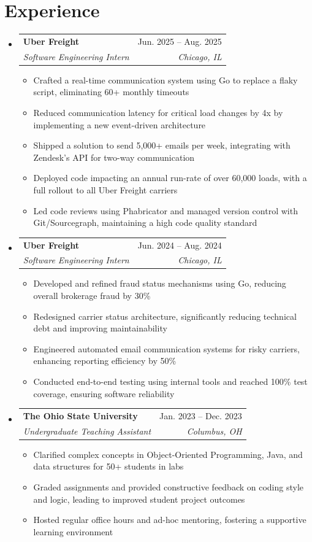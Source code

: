 \documentclass[letterpaper,11pt]{article}
\makeatletter
\newcommand{\resumeItem}[1]{
  \item\small{
    {#1 \vspace{-2pt}}
  }
}
\newcommand{\resumeSubheading}[4]{
  \vspace{-2pt}\item
    \begin{tabular*}{0.97\textwidth}[t]{l@{\extracolsep{\fill}}r}
      \textbf{#1} & #2 \\
      \textit{\small#3} & \textit{\small #4} \\
    \end{tabular*}\vspace{-7pt}
}
\newcommand{\resumeSubHeadingListStart}{\begin{itemize}[leftmargin=0.15in, label={}]}
\newcommand{\resumeSubHeadingListEnd}{\end{itemize}}
\newcommand{\resumeItemListStart}{\begin{itemize}}
\newcommand{\resumeItemListEnd}{\end{itemize}\vspace{-5pt}}
\makeatother
\begin{document}
\section{Experience}
  \resumeSubHeadingListStart
      \resumeSubheading
      {Uber Freight}{Jun. 2025 -- Aug. 2025}
      {Software Engineering Intern}{Chicago, IL}
      \resumeItemListStart
        \resumeItem{Crafted a real-time communication system using Go to replace a flaky script, eliminating 60+ monthly timeouts}
        \resumeItem{Reduced communication latency for critical load changes by 4x by implementing a new event-driven architecture}
        \resumeItem{Shipped a solution to send 5,000+ emails per week, integrating with Zendesk's API for two-way communication}
        \resumeItem{Deployed code impacting an annual run-rate of over 60,000 loads, with a full rollout to all Uber Freight carriers}
        \resumeItem{Led code reviews using Phabricator and managed version control with Git/Sourcegraph, maintaining a high code quality standard}
      \resumeItemListEnd
      \resumeSubheading
      {Uber Freight}{Jun. 2024 -- Aug. 2024}
      {Software Engineering Intern}{Chicago, IL}
      \resumeItemListStart
        \resumeItem{Developed and refined fraud status mechanisms using Go, reducing overall brokerage fraud by 30\%}
        \resumeItem{Redesigned carrier status architecture, significantly reducing technical debt and improving maintainability}
        \resumeItem{Engineered automated email communication systems for risky carriers, enhancing reporting efficiency by 50\%}
        \resumeItem{Conducted end-to-end testing using internal tools and reached 100\% test coverage, ensuring software reliability}
      \resumeItemListEnd
    \resumeSubheading
      {The Ohio State University}{Jan. 2023 -- Dec. 2023}
      {Undergraduate Teaching Assistant}{Columbus, OH}
      \resumeItemListStart
        \resumeItem{Clarified complex concepts in Object-Oriented Programming, Java, and data structures for 50+ students in labs}
        \resumeItem{Graded assignments and provided constructive feedback on coding style and logic, leading to improved student project outcomes}
        \resumeItem{Hosted regular office hours and ad-hoc mentoring, fostering a supportive learning environment}
      \resumeItemListEnd
  \resumeSubHeadingListEnd

\end{document}
